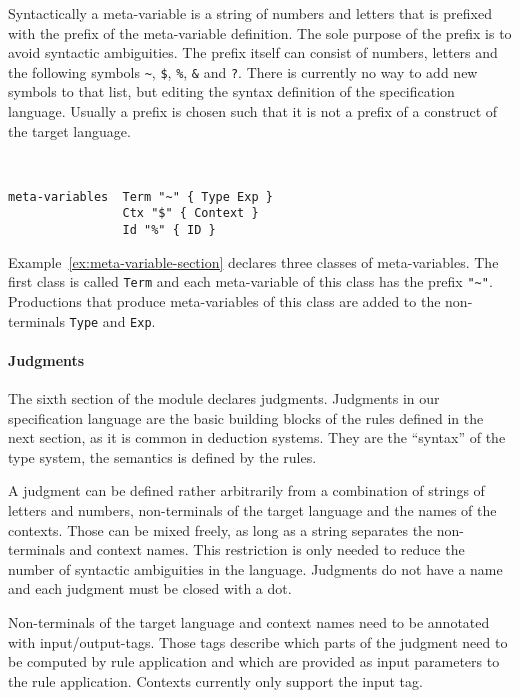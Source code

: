 Syntactically a meta-variable is a string of numbers and letters that
is prefixed with the prefix of the meta-variable definition. The sole
purpose of the prefix is to avoid syntactic ambiguities. The prefix
itself can consist of numbers, letters and the following symbols
\verb|~|, \verb|$|, \verb|%|, \verb|&| and \verb|?|.
 There is currently no way to add new
symbols to that list, but editing the syntax definition of the
specification language.  Usually a prefix is chosen such that it
is not a prefix of a construct of the target language.

\begin{example}{~}
\begin{lstlisting}[language=sltc]
meta-variables 	Term "~" { Type Exp }
                Ctx "$" { Context }
                Id "%" { ID }
\end{lstlisting}
\label{ex:meta-variable-section}
\end{example}

Example~\ref{ex:meta-variable-section} declares three classes of
meta-variables. The first class is called \verb|Term| and each
meta-variable of this class has the prefix \verb|"~"|. Productions
that produce meta-variables of this class are added to the
non-terminals \verb|Type| and \verb|Exp|.

\paragraph{Judgments} The sixth section of the module declares
judgments. Judgments in our specification language are the basic
building blocks of the rules defined in the next section, as it is
common in deduction systems. They are the ``syntax'' of the type
system, the semantics is defined by the rules.

A judgment can be defined rather arbitrarily from a combination of
strings of letters and numbers, non-terminals of the target language
and the names of the contexts. Those can be mixed freely, as long as a
string separates the non-terminals and context names. This restriction
is only needed to reduce the number of syntactic ambiguities in the
language. Judgments do not have a name and each judgment must be
closed with a dot.

Non-terminals of the target language and context names need to be
annotated with input/output-tags. Those tags describe which parts of
the judgment need to be computed by rule application and which are
provided as input parameters to the rule application. Contexts
currently only support the input tag.

